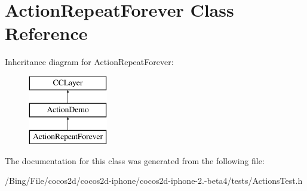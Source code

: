 \hypertarget{interface_action_repeat_forever}{\section{Action\-Repeat\-Forever Class Reference}
\label{interface_action_repeat_forever}
}
Inheritance diagram for Action\-Repeat\-Forever\-:\begin{figure}[H]
\begin{center}
\leavevmode
\includegraphics[height=3.000000cm]{interface_action_repeat_forever}
\end{center}
\end{figure}


The documentation for this class was generated from the following file\-:\begin{DoxyCompactItemize}
\item 
/\-Bing/\-File/cocos2d/cocos2d-\/iphone/cocos2d-\/iphone-\/2.-\/beta4/tests/Actions\-Test.\-h\end{DoxyCompactItemize}
